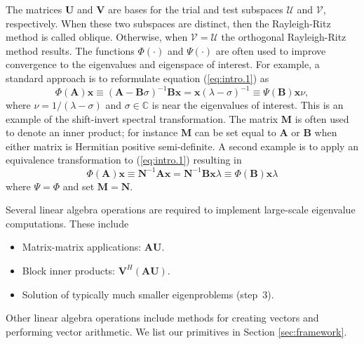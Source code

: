 \documentclass[acmtoms]{acmtrans2m}
\begin{document}
The matrices $\mathbf{U}$ and $\mathbf{V}$ are bases for the trial
and test subspaces $\mathcal{U}$ and $\mathcal{V}$, respectively.
When these two subspaces are distinct, then the Rayleigh-Ritz method is
called oblique. Otherwise, when $\mathcal{V} = \mathcal{U}$ the
orthogonal Rayleigh-Ritz method results. The functions $\Phi(\cdot)$
and $\Psi(\cdot)$ are often used to improve convergence to the
eigenvalues and eigenspace of interest. For example, a standard
approach is to reformulate equation (\ref{eq:intro.1}) as
$$
  \Phi(\mathbf{A}) \mathbf{x} \equiv
  (\mathbf{A}- \mathbf{B}\sigma)^{-1}\mathbf{B}\mathbf{x} =  \mathbf{x}
  (\lambda-\sigma)^{-1} \equiv \Psi(\mathbf{B})\mathbf{x} \nu ,
$$
where $\nu=1/(\lambda-\sigma)$ and $\sigma \in \mathbb{C}$ is near the 
eigenvalues of interest.
This is an example of the shift-invert spectral transformation. The
matrix $\mathbf{M}$ is often used to denote an inner product; for
instance $\mathbf{M}$ can be set equal to $\mathbf{A}$ or
$\mathbf{B}$ when either matrix is Hermitian positive semi-definite.
A second example is to apply an equivalence transformation to
(\ref{eq:intro.1}) resulting in
$$
   \Phi(\mathbf{A}) \mathbf{x} \equiv
   \mathbf{N}^{-1}\mathbf{A} \mathbf{x} = \mathbf{N}^{-1}\mathbf{B} \mathbf{x} \lambda
   \equiv \Phi(\mathbf{B})\mathbf{x}\lambda
$$
where $\Psi = \Phi$ and set $\mathbf{M}=\mathbf{N}$.

Several linear algebra operations are required to implement
large-scale eigenvalue computations. These include
\begin{itemize}
  \item Matrix-matrix applications: $\mathbf{A} \mathbf{U}$.
  \item Block inner products: $\mathbf{V}^H (\mathbf{A}\mathbf{U})$.
  \item Solution of typically much smaller eigenproblems (step~3).
\end{itemize}
Other linear algebra operations include methods for creating vectors and
performing vector arithmetic. We list our primitives in
Section \ref{sec:framework}.
\end{document}
